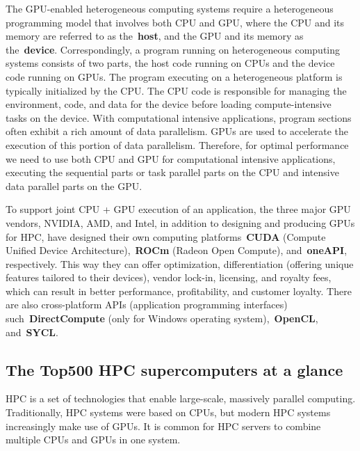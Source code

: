 \par
The GPU-enabled heterogeneous computing systems require a heterogeneous programming model that involves both CPU and GPU, where the CPU and its memory are referred to as the~\textbf{host}, and the GPU and its memory as the~\textbf{device}.
Correspondingly, a program running on heterogeneous computing systems consists of two parts, the host code running on CPUs and the device code running on GPUs.
The program executing on a heterogeneous platform is typically initialized by the CPU.
The CPU code is responsible for managing the environment, code, and data for the device before loading compute-intensive tasks on the device.
With computational intensive applications, program sections often exhibit a rich amount of data parallelism. GPUs are used to accelerate the execution of this portion of data parallelism.
Therefore, for optimal performance we need to use both CPU and GPU for computational intensive applications, executing the sequential parts or task parallel parts on the CPU and intensive data parallel parts on the GPU.


\par
To support joint CPU + GPU execution of an application, the three major GPU vendors, NVIDIA, AMD, and Intel, in addition to designing and producing GPUs for HPC, have designed their own computing platforms~\textbf{CUDA} (Compute Unified Device Architecture),~\textbf{ROCm} (Radeon Open Compute), and~\textbf{oneAPI}, respectively.
This way they can offer optimization, differentiation (offering unique features tailored to their devices), vendor lock-in, licensing, and royalty fees, which can result in better performance, profitability, and customer loyalty.
There are also cross-platform APIs (application programming interfaces) such~\textbf{DirectCompute} (only for Windows operating system),~\textbf{OpenCL}, and~\textbf{SYCL}.



\subsection{The Top500 HPC supercomputers at a glance}


\par
HPC is a set of technologies that enable large-scale, massively parallel computing.
Traditionally, HPC systems were based on CPUs, but modern HPC systems increasingly make use of GPUs.
It is common for HPC servers to combine multiple CPUs and GPUs in one system.


